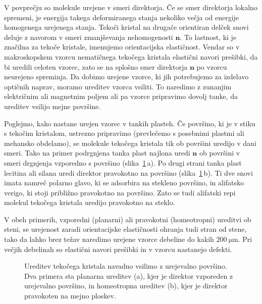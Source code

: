 V povprečju so molekule urejene v smeri direktorja. Če se smer direktorja lokalno
spremeni, je energija takega deformiranega 
stanja nekoliko večja od energije homogenega urejenega stanja. Tekoči kristal na
drugače orientiran delček snovi deluje z navorom v smeri zmanjševanja 
nehomogenosti $\mathbf{n}$. To lastnost, ki je značilna za tekoče kristale,
imenujemo orientacijska elastičnost. Vendar so v makroskopskem vzorcu
nematičnega tekočega kristala elastični navori prešibki,
da bi uredili celoten vzorec, zato se na splošno smer direktorja $\mathbf{n}$ 
po vzorcu neurejeno spreminja. Da dobimo urejene vzorce, ki jih potrebujemo za izdelavo
optičnih naprav, moramo ureditev vzorca 
vsiliti. To naredimo z zunanjim električnim ali magnetnim poljem 
ali pa vzorce pripravimo dovolj tanke, da ureditev vsilijo mejne površine. 

Poglejmo, kako nastane urejen vzorec v tankih plasteh. Če površino,
ki je v stiku s tekočim kristalom, ustrezno pripravimo (prevlečemo s posebnimi 
plastmi ali mehansko obdelamo), se molekule tekočega kristala tik ob površini uredijo
v dani smeri. Tako na primer podrgnjena tanka plast najlona uredi
$\mathbf{n}$ ob površini v smeri drgnjenja vzporedno s površino (slika~\ref{s7.20a}\,a). 
Po drugi strani tanka plast lecitina ali silana uredi direktor 
pravokotno na površino (slika~\ref{s7.20a}\,b). Ti dve snovi imata namreč
polarno glavo, ki se adsorbira na stekleno površino, in alifatsko verigo, 
ki stoji približno pravokotno na površino. Zato se tudi alifatski repi molekul
tekočega kristala uredijo pravokotno na steklo. 

V obeh primerih, 
vzporedni (planarni) ali pravokotni (homeotropni) ureditvi ob steni, 
se urejenost zaradi orientacijske elastičnosti
ohranja tudi stran od stene, tako da lahko brez težav naredimo urejene
vzorce debeline do kakih $200~\si{\micro\metre}$. Pri večjih debelinah so elastični
navori prešibki in v vzorcu nastanejo defekti.
\begin{figure}[ht]
\centering 
\def\svgwidth{120truemm} 

\caption{Ureditev tekočega kristala navadno vsilimo z urejevalno površino. Dva primera
sta planarna ureditev (a), kjer je direktor vzporeden z urejevalno površino, in 
homeotropna ureditev (b), kjer je direktor pravokoten na mejno ploskev.}
\label{s7.20a}
\end{figure}
 
